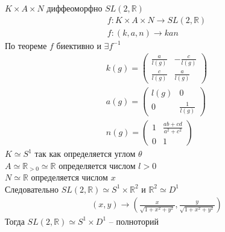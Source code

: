	$K \times A \times N$ диффеоморфно $SL(2,\mathbb{R})$
	\begin{gather*}
		f: K \times A \times N \to SL(2,\mathbb{R})\\
		f:(k,a,n) \to kan
	\end{gather*}
	По теореме $f$ биективно и $\exists f^{-1}$
	\begin{gather*}
		k(g) = 
		\begin{pmatrix}
			\frac{a}{l(g)} & -\frac{c}{l(g)}\\
			\frac{c}{l(g)} & \frac{a}{l(g)}
		\end{pmatrix}\\
		a(g) = 
		\begin{pmatrix}
			l(g) & 0\\
			0 & \frac{1}{l(g)}
		\end{pmatrix}\\
		n(g) = 
		\begin{pmatrix}
			1 & \frac{ab + cd}{a^2 + c^2}\\
			0 & 1
		\end{pmatrix}
	\end{gather*}
	$K \simeq S^{1}$ так как определяется углом $\theta$\\
	$A \simeq \mathbb{R}_{>0} \simeq \mathbb{R}$ определяется числом $l > 0$\\
	$N \simeq \mathbb{R}$ определяется числом $x$\\
	Следовательно $SL(2,\mathbb{R}) \simeq S^{1} \times \mathbb{R}^{2}$ и $\mathbb{R}^2 \simeq D^{1}$
	\begin{gather*}
		(x,y) \to (\frac{x}{\sqrt{1 + x^2 + y^2}}, \frac{y}{\sqrt{1 + x^2 + y^2}})
	\end{gather*}
	Тогда $SL(2,\mathbb{R}) \simeq S^{1} \times D^{1}$ -- полноторий



